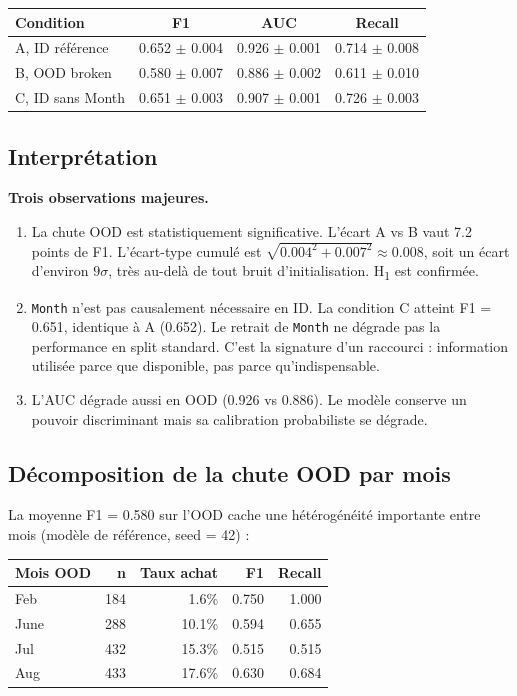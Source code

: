\documentclass[11pt,a4paper]{article}
\newcommand{\code}[1]{\texttt{\small#1}}
\begin{document}
\begin{center}
\begin{tabular}{lccc}
\toprule
\textbf{Condition} & \textbf{F1} & \textbf{AUC} & \textbf{Recall} \\
\midrule
A, ID référence       & 0.652 $\pm$ 0.004 & 0.926 $\pm$ 0.001 & 0.714 $\pm$ 0.008 \\
B, OOD broken         & 0.580 $\pm$ 0.007 & 0.886 $\pm$ 0.002 & 0.611 $\pm$ 0.010 \\
C, ID sans Month      & 0.651 $\pm$ 0.003 & 0.907 $\pm$ 0.001 & 0.726 $\pm$ 0.003 \\
\bottomrule
\end{tabular}
\end{center}

\subsection*{Interprétation}

\textbf{Trois observations majeures.}

\begin{enumerate}
\item La chute OOD est statistiquement significative. L'écart A vs B vaut 7.2 points de F1. L'écart-type cumulé est $\sqrt{0.004^2 + 0.007^2} \approx 0.008$, soit un écart d'environ $9\sigma$, très au-delà de tout bruit d'initialisation. H\textsubscript{1} est confirmée.

\item \code{Month} n'est pas causalement nécessaire en ID. La condition C atteint F1 = 0.651, identique à A (0.652). Le retrait de \code{Month} ne dégrade pas la performance en split standard. C'est la signature d'un raccourci : information utilisée parce que disponible, pas parce qu'indispensable.

\item L'AUC dégrade aussi en OOD (0.926 vs 0.886). Le modèle conserve un pouvoir discriminant mais sa calibration probabiliste se dégrade.
\end{enumerate}

\subsection*{Décomposition de la chute OOD par mois}

La moyenne F1 = 0.580 sur l'OOD cache une hétérogénéité importante entre mois (modèle de référence, seed = 42) :

\begin{center}
\begin{tabular}{lrrrr}
\toprule
\textbf{Mois OOD} & \textbf{n} & \textbf{Taux achat} & \textbf{F1} & \textbf{Recall} \\
\midrule
Feb  & 184 & 1.6\%  & 0.750 & 1.000 \\
June & 288 & 10.1\% & 0.594 & 0.655 \\
Jul  & 432 & 15.3\% & 0.515 & 0.515 \\
Aug  & 433 & 17.6\% & 0.630 & 0.684 \\
\bottomrule
\end{tabular}
\end{center}
\end{document}
